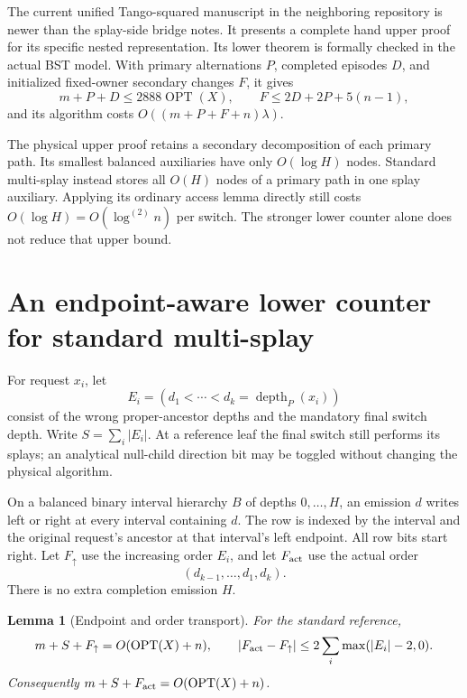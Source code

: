 \documentclass[11pt]{article}
\newtheorem{lemma}[theorem]{Lemma}
\newcommand{\OPT}{\operatorname{OPT}}
\newcommand{\lgit}[1]{\log^{(#1)}}
\begin{document}
The current unified Tango-squared manuscript in the neighboring
repository is newer than the splay-side bridge notes. It presents a
complete hand upper proof for its specific nested representation.
Its lower theorem is formally checked in the actual BST model. With
primary alternations $P$, completed episodes $D$, and initialized
fixed-owner secondary changes $F$, it gives
\[
 m+P+D\le2888\OPT(X),\qquad
 F\le2D+2P+5(n-1),
\]
and its algorithm costs $O((m+P+F+n)\lambda)$.

The physical upper proof retains a secondary decomposition of each
primary path. Its smallest balanced auxiliaries have only
$O(\log H)$ nodes. Standard multi-splay instead stores all $O(H)$
nodes of a primary path in one splay auxiliary. Applying its ordinary
access lemma directly still costs $O(\log H)=O(\lgit{2}n)$ per switch.
The stronger lower counter alone does not reduce that upper bound.

\section{An endpoint-aware lower counter for standard multi-splay}

For request $x_i$, let
\[
 E_i=(d_1<\cdots<d_k=\operatorname{depth}_P(x_i))
\]
consist of the wrong proper-ancestor depths and the mandatory final
switch depth. Write $S=\sum_i|E_i|$. At a reference leaf the final
switch still performs its splays; an analytical null-child direction
bit may be toggled without changing the physical algorithm.

On a balanced binary interval hierarchy $B$ of depths $0,\ldots,H$,
an emission $d$ writes left or right at every interval containing $d$.
The row is indexed by the interval and the original request's ancestor
at that interval's left endpoint. All row bits start right. Let
$F_\uparrow$ use the increasing order $E_i$, and let $F_{\rm act}$
use the actual order
\[
 (d_{k-1},\ldots,d_1,d_k).
\]
There is no extra completion emission $H$.

\begin{lemma}[Endpoint and order transport]\label{lem:counter}
For the standard reference,
\[
 m+S+F_\uparrow=O(\OPT(X)+n),\qquad
 |F_{\rm act}-F_\uparrow|
 \le2\sum_i\max(|E_i|-2,0).
\]
Consequently $m+S+F_{\rm act}=O(\OPT(X)+n)$.
\end{lemma}
\end{document}
